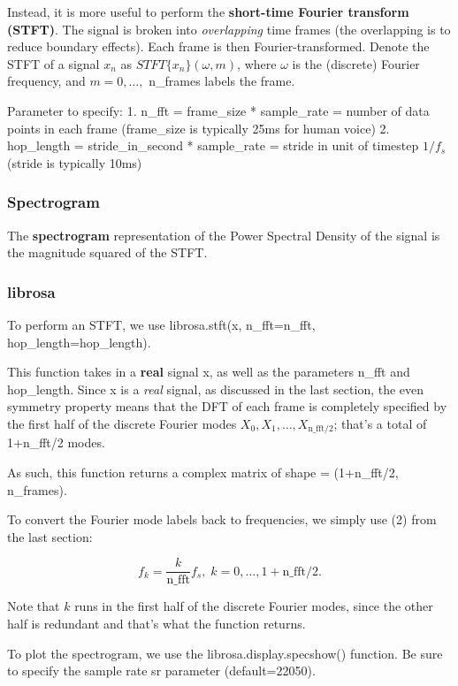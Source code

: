 \documentclass[11pt]{article}
\begin{document}
Instead, it is more useful to perform the \textbf{short-time Fourier
transform (STFT)}. The signal is broken into \emph{overlapping} time
frames (the overlapping is to reduce boundary effects). Each frame is
then Fourier-transformed. Denote the STFT of a signal \(x_n\) as
\(STFT\{x_n\}(\omega, m)\), where \(\omega\) is the (discrete) Fourier
frequency, and \(m=0,\ldots,\) n\_frames labels the frame.

Parameter to specify: 1. n\_fft = frame\_size * sample\_rate = number of
data points in each frame (frame\_size is typically 25ms for human
voice) 2. hop\_length = stride\_in\_second * sample\_rate = stride in
unit of timestep \(1/f_s\) (stride is typically 10ms)

\hypertarget{spectrogram}{%
\subsubsection{Spectrogram}\label{spectrogram}}

The \textbf{spectrogram} representation of the Power Spectral Density of
the signal is the magnitude squared of the STFT.

\hypertarget{librosa}{%
\subsubsection{librosa}\label{librosa}}

To perform an STFT, we use librosa.stft(x, n\_fft=n\_fft,
hop\_length=hop\_length).

This function takes in a \textbf{real} signal x, as well as the
parameters n\_fft and hop\_length. Since x is a \emph{real} signal, as
discussed in the last section, the even symmetry property means that the
DFT of each frame is completely specified by the first half of the
discrete Fourier modes $X_{0}, X_1,\ldots,X_{\text{n\_fft}/2}$; that's
a total of 1+n\_fft/2 modes.

As such, this function returns a complex matrix of shape = (1+n\_fft/2,
n\_frames).

To convert the Fourier mode labels back to frequencies, we simply use
(2) from the last section:

\[ f_k = \frac{k}{\text{n\_fft}}f_s,\;k=0,\ldots,1+\text{n\_fft}/2. \label{STFTfreq}\tag{6}\]

Note that \(k\) runs in the first half of the discrete Fourier modes,
since the other half is redundant and that's what the function returns.

To plot the spectrogram, we use the librosa.display.specshow() function.
Be sure to specify the sample rate sr parameter (default=22050).
\end{document}
